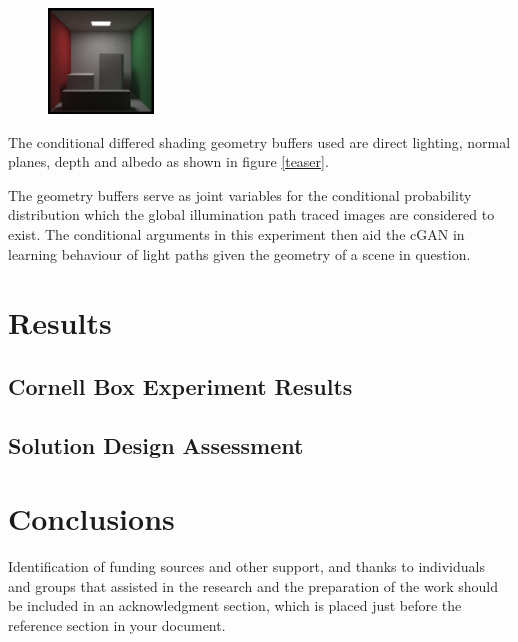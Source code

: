 \documentclass[sigconf,authordraft]{acmart}
\begin{document}
\begin{figure}[h]
\includegraphics[width=0.25\textwidth]{sc-1080-d-45.png}
\end{figure}

The conditional differed shading geometry buffers used are direct lighting, normal planes, depth and albedo as shown in figure \ref{teaser}.

The geometry buffers serve as joint variables for the conditional probability distribution which the global illumination path traced images are considered to exist. The conditional arguments in this experiment then aid the cGAN in learning behaviour of light paths given the geometry of a scene in question. 

\section{Results}
\subsection{Cornell Box Experiment Results}
\subsection{Solution Design Assessment}
\section{Conclusions}



\begin{acks}
Identification of funding sources and other support, and thanks to
individuals and groups that assisted in the research and the
preparation of the work should be included in an acknowledgment
section, which is placed just before the reference section in your
document.
\end{acks}




\end{document}
